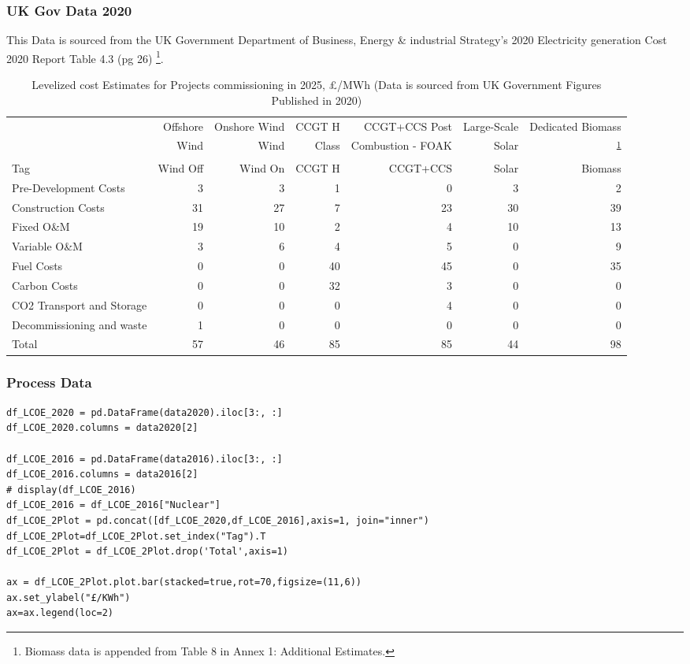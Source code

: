 \documentclass[11pt]{article}
\numberwithin{equation}{section}
\begin{document}
\subsubsection{UK Gov Data 2020}
\label{sec:org3298062}
This Data is sourced from the UK Government Department of Business, Energy \& industrial Strategy's 2020 Electricity generation Cost 2020 Report Table 4.3 (pg 26) \cite{DeptEnerLCOE}\footnote{Biomass data is appended from Table 8 in Annex 1: Additional Estimates\cite{DeptEnerLCOE}.\label{org93e318c}}.
\begin{table}
\caption{\label{tabLCOEBreakdownGov2020}Levelized cost Estimates for Projects commissioning in 2025, £/MWh (Data is sourced from UK Government Figures Published in 2020\cite{DeptEnerLCOE})}
\centering
\begin{tabular}{lrrrrrr}
\toprule
 & Offshore & Onshore Wind & CCGT H & CCGT+CCS Post & Large-Scale & Dedicated Biomass\\
 & Wind & Wind & Class & Combustion - FOAK & Solar & \textsuperscript{\ref{org93e318c}}\\
\midrule
Tag & Wind Off & Wind On & CCGT H & CCGT+CCS & Solar & Biomass\\
Pre-Development Costs & 3 & 3 & 1 & 0 & 3 & 2\\
Construction Costs & 31 & 27 & 7 & 23 & 30 & 39\\
Fixed O\&M & 19 & 10 & 2 & 4 & 10 & 13\\
Variable O\&M & 3 & 6 & 4 & 5 & 0 & 9\\
Fuel Costs & 0 & 0 & 40 & 45 & 0 & 35\\
Carbon Costs & 0 & 0 & 32 & 3 & 0 & 0\\
CO2 Transport and Storage & 0 & 0 & 0 & 4 & 0 & 0\\
Decommissioning and waste & 1 & 0 & 0 & 0 & 0 & 0\\
Total & 57 & 46 & 85 & 85 & 44 & 98\\
\bottomrule
\end{tabular}
\end{table}
\subsubsection{Process Data}
\label{sec:org812632e}
\begin{verbatim}
df_LCOE_2020 = pd.DataFrame(data2020).iloc[3:, :]
df_LCOE_2020.columns = data2020[2]

df_LCOE_2016 = pd.DataFrame(data2016).iloc[3:, :]
df_LCOE_2016.columns = data2016[2]
# display(df_LCOE_2016)
df_LCOE_2016 = df_LCOE_2016["Nuclear"]
df_LCOE_2Plot = pd.concat([df_LCOE_2020,df_LCOE_2016],axis=1, join="inner")
df_LCOE_2Plot=df_LCOE_2Plot.set_index("Tag").T
df_LCOE_2Plot = df_LCOE_2Plot.drop('Total',axis=1)

ax = df_LCOE_2Plot.plot.bar(stacked=true,rot=70,figsize=(11,6))
ax.set_ylabel("£/KWh")
ax=ax.legend(loc=2)
\end{verbatim}
\end{document}
